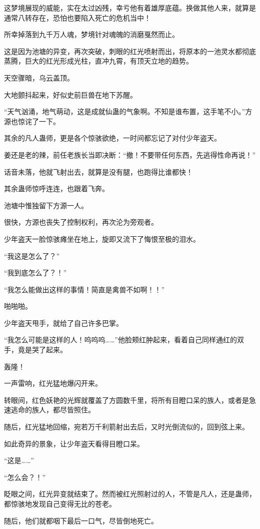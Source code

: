 \begin{this_body}
这梦境展现的威能，实在太过凶残，幸亏他有着雄厚底蕴。换做其他人来，就算是通常八转存在，恐怕也要陷入死亡的危机当中！

所幸掉落到九千万人魂，梦境针对魂魄的消磨戛然而止。

这是因为池塘的异变，再次突破，刺眼的红光喷射而出，将原本的一池灵水都彻底蒸腾，巨大的红光形成光柱，直冲九霄，有顶天立地的趋势。

天空骤暗，乌云盖顶。

大地颤抖起来，好似史前巨兽在地下苏醒。

“天气汹涌，地气萌动，这是成就仙蛊的气象啊。不知是谁布置，这手笔不小。”方源也惊诧了一下。

其余的凡人蛊师，更是各个惊骇欲绝，一时间都忘记了对付少年盗天。

姜还是老的辣，前任老族长当即决断：“撤！不要带任何东西，先逃得性命再说！”

话音未落，他就飞射出去，就算是没有腿，也跑得比谁都快！

其余蛊师惊呼连连，也跟着飞奔。

池塘中惟独留下方源一人。

很快，方源也丧失了控制权利，再次沦为旁观者。

少年盗天一脸惊骇瘫坐在地上，旋即又流下了悔恨至极的泪水。

“我这是怎么了？”

“我到底怎么了？！”

“我怎么能做出这样的事情！简直是禽兽不如啊！！”

啪啪啪。

少年盗天甩手，就给了自己许多巴掌。

“我怎么可能是这样的人！呜呜呜……”他脸颊红肿起来，看着自己同样通红的双手，竟是哭了起来。

轰隆！

一声雷响，红光猛地爆闪开来。

转眼间，红色妖艳的光辉就覆盖了方圆数千里，将所有目瞪口呆的族人，或者是急速逃命的族人，都尽皆照住。

随后，红光猛地回缩，宛若万千利箭射出去后，又时光倒流似的，回到弦上来。

如此奇异的景象，让少年盗天看得目瞪口呆。

“这是……”

“怎么会？！”

眨眼之间，红光异变就结束了。然而被红光照射过的人，不管是凡人，还是蛊师，都惊骇地发现自己变得无比的苍老。

随后，他们就都咽下最后一口气，尽皆倒地死亡。


\end{this_body}
